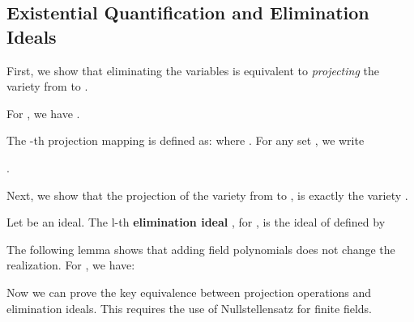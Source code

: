 \documentclass[envcountsect]{llncs}
\begin{document}
\subsection{Existential Quantification and Elimination Ideals}

First, we show that eliminating the  variables is equivalent to {\em projecting} the variety  from  to . 

\begin{lemma}\label{formula-ideal}
For , we have .
\end{lemma}

\begin{definition}[Projection]
The -th projection mapping is defined as:  where .
For any set , we write 
\end{definition}

\begin{lemma}\label{just-projection}
.
\end{lemma}

Next, we show that the projection  of the variety  from  to ,  is exactly the variety . 

\begin{definition}
Let  be an ideal. The l-th {\bf elimination ideal} , for , is the ideal of  defined by 
\end{definition}

The following lemma shows that adding field polynomials does not change the realization. For , we have:
\begin{lemma} \label{extend-formulas}

\end{lemma}

Now we can prove the key equivalence between projection operations and elimination ideals. This requires the use of Nullstellensatz for finite fields.
\end{document}

